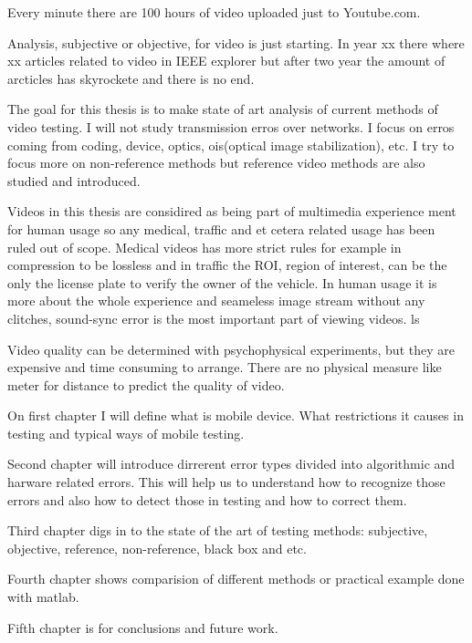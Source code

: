 
Every minute there are 100 hours of video uploaded just to Youtube.com.
~\cite{youtube} 

Analysis, subjective or objective, for video is just starting. In year xx
there where xx articles related to video in IEEE explorer but after two year the amount of
arcticles has skyrockete and there is no end. 

The goal for this thesis is to make state of art analysis of current methods
of video testing. I will not study transmission erros over networks. I focus 
on erros coming from coding, device, optics,
ois(optical image stabilization), etc. I try to focus more on non-reference
methods but reference video methods are also studied and introduced. 

Videos in this thesis are considired as being part of multimedia experience
ment for human usage so any medical, traffic and et cetera related usage has
been ruled out of scope. Medical videos has more strict rules for example in
compression to be lossless and in traffic the ROI, region of interest, can be
the only the license plate to verify the owner of the vehicle. In human usage
it is more about the whole experience and seameless image stream without any
clitches, sound-sync error is the most important part of viewing videos. ls

Video quality can be determined with psychophysical experiments, but they are
expensive and time consuming to arrange. There are no physical measure like
meter for distance to predict the quality of video. 

On first chapter I will define what is mobile device. What restrictions it
causes in testing and typical ways of mobile testing.  

Second chapter will introduce dirrerent error types divided into algorithmic
and harware related errors. This will help us to understand how to recognize
those errors and also how to detect those in testing and how to correct them.  

Third chapter digs in to the state of the art of testing methods: 
subjective, objective, reference, non-reference, black box and etc. 

Fourth chapter shows comparision of different methods or practical example
done with matlab. 

Fifth chapter is for conclusions and future work. 
